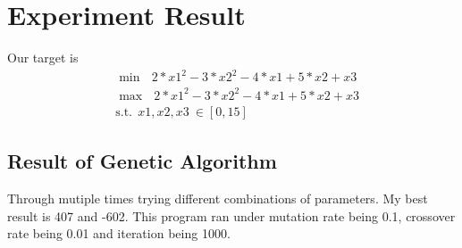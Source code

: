 \documentclass[11pt]{article} %
\begin{document}
\section{Experiment Result}
Our target is 
\begin{equation}
	\begin{aligned}
	&\mathop{\min}\ \ \ 2*x1^2 - 3*x2^2 - 4 *x1 + 5*x2 +x3 \\
	&\mathop{\max}\ \ \ 2*x1^2 - 3*x2^2 - 4 *x1 + 5*x2 +x3 \\
	&\text{s.t.}\ \  x1,x2,x3\ \in [0,15]
	\end{aligned}
\end{equation}
\subsection{Result of Genetic Algorithm}
Through mutiple times trying different combinations of parameters. My best result is 407 and -602. This program ran under mutation rate being 0.1, crossover rate being 0.01 and iteration being 1000.
\end{document}
